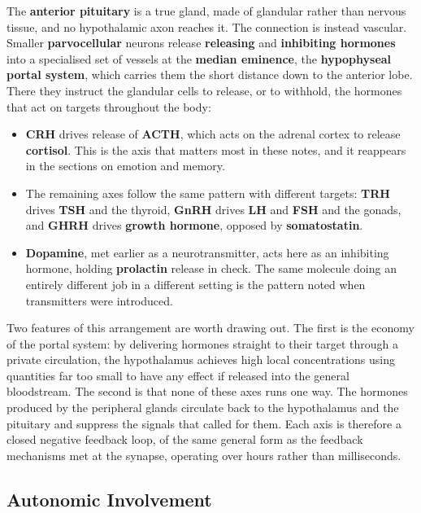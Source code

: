 \documentclass[11pt]{article}
\begin{document}
The \textbf{anterior pituitary} is a true gland, made of glandular rather than nervous tissue, and no hypothalamic axon reaches it. The connection is instead vascular. Smaller \textbf{parvocellular} neurons release \textbf{releasing} and \textbf{inhibiting hormones} into a specialised set of vessels at the \textbf{median eminence}, the \textbf{hypophyseal portal system}, which carries them the short distance down to the anterior lobe. There they instruct the glandular cells to release, or to withhold, the hormones that act on targets throughout the body:

\begin{itemize}
    \item \textbf{CRH} drives release of \textbf{ACTH}, which acts on the adrenal cortex to release \textbf{cortisol}. This is the axis that matters most in these notes, and it reappears in the sections on emotion and memory.
    \item The remaining axes follow the same pattern with different targets: \textbf{TRH} drives \textbf{TSH} and the thyroid, \textbf{GnRH} drives \textbf{LH} and \textbf{FSH} and the gonads, and \textbf{GHRH} drives \textbf{growth hormone}, opposed by \textbf{somatostatin}.
    \item \textbf{Dopamine}, met earlier as a neurotransmitter, acts here as an inhibiting hormone, holding \textbf{prolactin} release in check. The same molecule doing an entirely different job in a different setting is the pattern noted when transmitters were introduced.
\end{itemize}

Two features of this arrangement are worth drawing out. The first is the economy of the portal system: by delivering hormones straight to their target through a private circulation, the hypothalamus achieves high local concentrations using quantities far too small to have any effect if released into the general bloodstream. The second is that none of these axes runs one way. The hormones produced by the peripheral glands circulate back to the hypothalamus and the pituitary and suppress the signals that called for them. Each axis is therefore a closed negative feedback loop, of the same general form as the feedback mechanisms met at the synapse, operating over hours rather than milliseconds.

\subsection{Autonomic Involvement}
\end{document}
